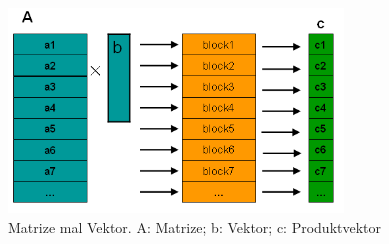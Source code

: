 
\begin{figure}[htbp]
\includegraphics[width=3.5in]{.//pic//MatrixVektor}
\caption{Matrize mal Vektor. A: Matrize; b: Vektor; c: Produktvektor}
\label{MatrixVektor} 
\end{figure}
